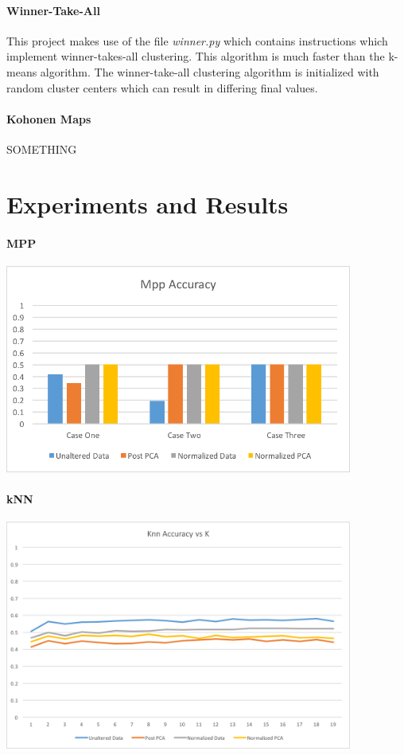 \documentclass{article}
\begin{document}
\paragraph{Winner-Take-All}
This project makes use of the file \textit{winner.py} which contains instructions
which implement winner-takes-all clustering. This algorithm is much faster than the
k-means algorithm. The winner-take-all clustering algorithm is initialized with random
cluster centers which can result in differing final values.

\paragraph{Kohonen Maps}
SOMETHING


\newpage
\section*{Experiments and Results}
\paragraph{MPP}

\centerline{\includegraphics[width = 4.5in]{images/mpp-results}}

\paragraph{kNN}

\centerline{\includegraphics[width = 4.5in]{images/knn-results}}
\end{document}

